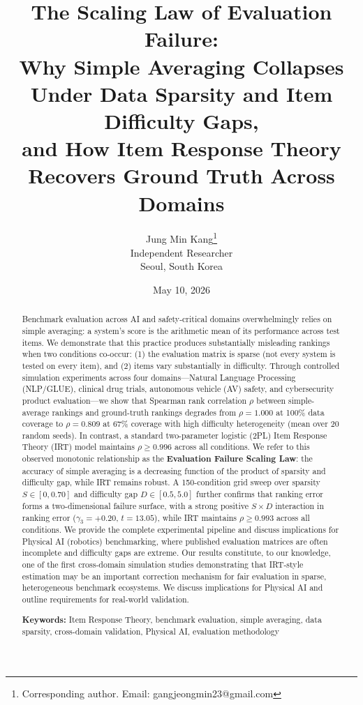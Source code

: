 \documentclass[11pt,a4paper]{article}
\title{The Scaling Law of Evaluation Failure:\\
Why Simple Averaging Collapses Under Data Sparsity and Item Difficulty Gaps,\\
and How Item Response Theory Recovers Ground Truth Across Domains}
\author{Jung Min Kang\thanks{Corresponding author. Email: gangjeongmin23@gmail.com}\\
Independent Researcher\\
Seoul, South Korea}
\date{May 10, 2026}
\begin{document}
\maketitle

\begin{abstract}
Benchmark evaluation across AI and safety-critical domains overwhelmingly relies on simple averaging: a system's score is the arithmetic mean of its performance across test items. We demonstrate that this practice produces substantially misleading rankings when two conditions co-occur: (1) the evaluation matrix is sparse (not every system is tested on every item), and (2) items vary substantially in difficulty. Through controlled simulation experiments across four domains---Natural Language Processing (NLP/GLUE), clinical drug trials, autonomous vehicle (AV) safety, and cybersecurity product evaluation---we show that Spearman rank correlation $\rho$ between simple-average rankings and ground-truth rankings degrades from $\rho = 1.000$ at 100\% data coverage to $\rho = 0.809$ at 67\% coverage with high difficulty heterogeneity (mean over 20 random seeds). In contrast, a standard two-parameter logistic (2PL) Item Response Theory (IRT) model maintains $\rho \geq 0.996$ across all conditions. We refer to this observed monotonic relationship as the \textbf{Evaluation Failure Scaling Law}: the accuracy of simple averaging is a decreasing function of the product of sparsity and difficulty gap, while IRT remains robust. A 150-condition grid sweep over sparsity $S \in [0, 0.70]$ and difficulty gap $D \in [0.5, 5.0]$ further confirms that ranking error forms a two-dimensional failure surface, with a strong positive $S \times D$ interaction in ranking error ($\gamma_3 = +0.20$, $t = 13.05$), while IRT maintains $\rho \geq 0.993$ across all conditions. We provide the complete experimental pipeline and discuss implications for Physical AI (robotics) benchmarking, where published evaluation matrices are often incomplete and difficulty gaps are extreme. Our results constitute, to our knowledge, one of the first cross-domain simulation studies demonstrating that IRT-style estimation may be an important correction mechanism for fair evaluation in sparse, heterogeneous benchmark ecosystems. We discuss implications for Physical AI and outline requirements for real-world validation.

\medskip
\noindent\textbf{Keywords:} Item Response Theory, benchmark evaluation, simple averaging, data sparsity, cross-domain validation, Physical AI, evaluation methodology
\end{abstract}
\end{document}
